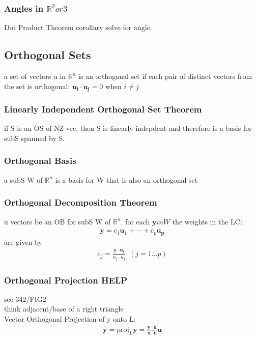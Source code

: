 \documentclass[12pt]{article}
\newcommand{\R}{\mathbb{R}}
\begin{document}
    \subsubsection{Angles in $\R^2 or 3$ }
        Dot Product Theorem corollary solve for angle.
\subsection{Orthogonal Sets}
    a set of vectors u in $\R^n$  is an orthogonal set if
    each pair of distinct vectors from the set is orthogonal:
    $ \bm{u_{i}}\cdot \bm{u_{j}}= 0 $  when $i\ne j$ 
    \subsubsection{Linearly Independent Orthogonal Set Theorem}
        if S is an OS of NZ vec, then S is linearly indepdent and 
        therefore is a basis for subS spanned by S.
    \subsubsection{Orthogonal Basis}
        a subS W of $\R^n$  is a basis for W that is also an orthogonal set
    \subsubsection{Orthogonal Decomposition Theorem}
        u vectors be an OB for subS W of $\R^n$. for each $\bm{y}in W$ 
        the weights in the LC:
        \begin{align*}
            \bm{y} = c_{1}\bm{u_{1}}+ \cdots + c_{p}\bm{u_{p}}
        \end{align*}
        are given by 
        \begin{align*}
            c_{j} = \frac{\bm{y}\cdot \bm{u_{j}}}{u_{j}\cdot u_{j}}\,\,\,
            (j= 1\dots p)
        \end{align*}
    \subsubsection{Orthogonal Projection HELP}
        see 342/FIG2\\
        think adjacent/base of a right triangle\\
        Vector Orthogonal Projection of y onto L:
        \begin{align*}
            \bm{\hat{y}} = \text{proj}_{L}\bm{y} = 
            \frac{\bm{y}\cdot \bm{u}}{\bm{u}\cdot \bm{u}}\bm{u}
        \end{align*}
\end{document}
